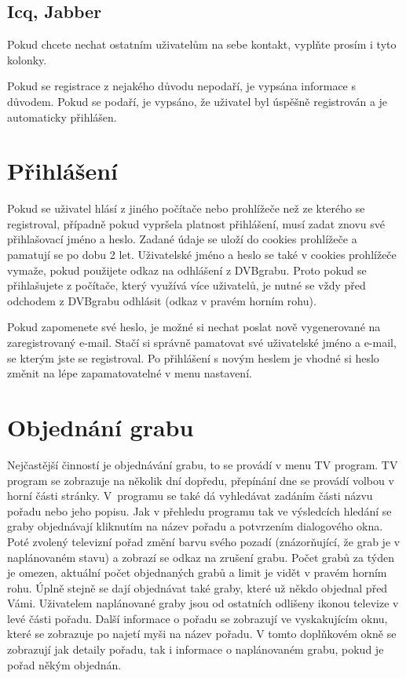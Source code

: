 \subsection{Icq, Jabber}

Pokud chcete nechat ostatním uživatelům na sebe kontakt, vyplňte prosím i tyto kolonky.

Pokud se registrace z nejakého důvodu nepodaří, je vypsána informace s důvodem. Pokud se podaří, je vypsáno, že uživatel byl úspěšně registrován a je automaticky přihlášen.

\section{Přihlášení}

Pokud se uživatel hlásí z jiného počítače nebo prohlížeče než ze kterého se registroval, případně pokud vypršela platnost přihlášení, musí zadat znovu své přihlašovací jméno a heslo. Zadané údaje se uloží do cookies prohlížeče a pamatují se po dobu 2 let. Uživatelské jméno a heslo se také v cookies prohlížeče vymaže, pokud použijete odkaz na odhlášení z DVBgrabu. Proto pokud se přihlašujete z počítače, který využívá více uživatelů, je nutné se vždy před odchodem z DVBgrabu odhlásit (odkaz v pravém horním rohu).

Pokud zapomenete své heslo, je možné si nechat poslat nově vygenerované na zaregistrovaný \linebreak[4] e-mail. Stačí si správně pamatovat své uživatelské jméno a e-mail, se kterým jste se registroval. Po přihlášení s novým heslem je vhodné si heslo změnit na lépe zapamatovatelné v menu nastavení.
\vfil
\pagebreak
\section{Objednání grabu}

Nejčastější činností je objednávání grabu, to se provádí v menu TV program. TV program se zobrazuje na několik dní dopředu, přepínání dne se provádí volbou v horní části stránky. V~programu se také dá vyhledávat zadáním části názvu pořadu nebo jeho popisu. Jak v přehledu programu tak ve výsledcích hledání se graby objednávají kliknutím na název pořadu a potvrzením dialogového okna. Poté zvolený televizní pořad změní barvu svého pozadí (znázorňující, že grab je v naplánovaném stavu) a zobrazí se odkaz na zrušení grabu. Počet grabů za týden je omezen, aktuální počet objednaných grabů a limit je vidět v pravém horním rohu. Úplně stejně se dají objednávat také graby, které už někdo objednal před Vámi. Uživatelem naplánované graby jsou od ostatních odlišeny ikonou televize v levé části pořadu. Další informace o pořadu se zobrazují ve vyskakujícím oknu, které se zobrazuje po najetí myši na název pořadu. V tomto doplňkovém okně se zobrazují jak detaily pořadu, tak i informace o naplánovaném grabu, pokud je pořad někým objednán.

